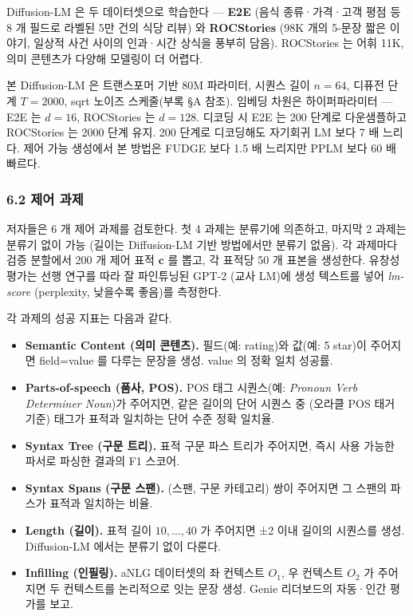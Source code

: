 \documentclass[
]{article}
\providecommand{\tightlist}{%
  \setlength{\itemsep}{0pt}\setlength{\parskip}{0pt}}
\begin{document}
Diffusion-LM 은 두 데이터셋으로 학습한다 --- \textbf{E2E} (음식
종류·가격·고객 평점 등 8 개 필드로 라벨된 5만 건의 식당 리뷰) 와
\textbf{ROCStories} (98K 개의 5-문장 짧은 이야기, 일상적 사건 사이의
인과·시간 상식을 풍부히 담음). ROCStories 는 어휘 11K, 의미 콘텐츠가
다양해 모델링이 더 어렵다.

본 Diffusion-LM 은 트랜스포머 기반 80M 파라미터, 시퀀스 길이 \(n=64\),
디퓨전 단계 \(T=2000\), sqrt 노이즈 스케줄(부록 §A 참조). 임베딩 차원은
하이퍼파라미터 --- E2E 는 \(d=16\), ROCStories 는 \(d=128\). 디코딩 시
E2E 는 200 단계로 다운샘플하고 ROCStories 는 2000 단계 유지. 200 단계로
디코딩해도 자기회귀 LM 보다 7 배 느리다. 제어 가능 생성에서 본 방법은
FUDGE 보다 1.5 배 느리지만 PPLM 보다 60 배 빠르다.

\hypertarget{uxc81cuxc5b4-uxacfcuxc81c}{%
\subsubsection{6.2 제어 과제}\label{uxc81cuxc5b4-uxacfcuxc81c}}

저자들은 6 개 제어 과제를 검토한다. 첫 4 과제는 분류기에 의존하고,
마지막 2 과제는 분류기 없이 가능 (길이는 Diffusion-LM 기반 방법에서만
분류기 없음). 각 과제마다 검증 분할에서 200 개 제어 표적 \(\mathbf{c}\)
를 뽑고, 각 표적당 50 개 표본을 생성한다. 유창성 평가는 선행 연구를 따라
잘 파인튜닝된 GPT-2 (교사 LM)에 생성 텍스트를 넣어 \emph{lm-score}
(perplexity, 낮을수록 좋음)를 측정한다.

각 과제의 성공 지표는 다음과 같다.

\begin{itemize}
\tightlist
\item
  \textbf{Semantic Content (의미 콘텐츠).} 필드(예: rating)와 값(예: 5
  star)이 주어지면 field=value 를 다루는 문장을 생성. value 의 정확 일치
  성공률.
\item
  \textbf{Parts-of-speech (품사, POS).} POS 태그 시퀀스(예:
  \emph{Pronoun Verb Determiner Noun})가 주어지면, 같은 길이의 단어
  시퀀스 중 (오라클 POS 태거 기준) 태그가 표적과 일치하는 단어 수준 정확
  일치율.
\item
  \textbf{Syntax Tree (구문 트리).} 표적 구문 파스 트리가 주어지면, 즉시
  사용 가능한 파서로 파싱한 결과의 F1 스코어.
\item
  \textbf{Syntax Spans (구문 스팬).} (스팬, 구문 카테고리) 쌍이 주어지면
  그 스팬의 파스가 표적과 일치하는 비율.
\item
  \textbf{Length (길이).} 표적 길이 \(10, \dots, 40\) 가 주어지면 ±2
  이내 길이의 시퀀스를 생성. Diffusion-LM 에서는 분류기 없이 다룬다.
\item
  \textbf{Infilling (인필링).} aNLG 데이터셋의 좌 컨텍스트 \(O_1\), 우
  컨텍스트 \(O_2\) 가 주어지면 두 컨텍스트를 논리적으로 잇는 문장 생성.
  Genie 리더보드의 자동·인간 평가를 보고.
\end{itemize}
\end{document}
